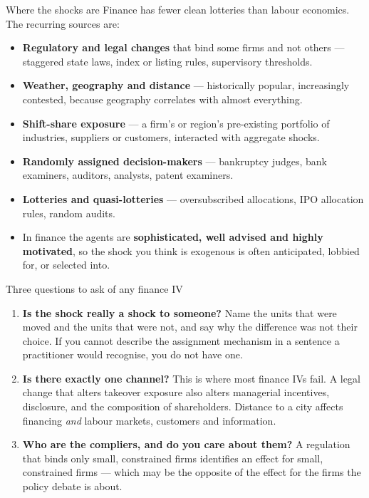 \documentclass[
  11pt,
  ignorenonframetext,
  aspectratio=169,
]{beamer}
\providecommand{\tightlist}{%
  \setlength{\itemsep}{0pt}\setlength{\parskip}{0pt}}
\begin{document}
\begin{frame}{Where the shocks are}
\protect{}\label{where-the-shocks-are}
Finance has fewer clean lotteries than labour economics. The recurring
sources are:

\begin{itemize}
\tightlist
\item
  \textbf{Regulatory and legal changes} that bind some firms and not
  others --- staggered state laws, index or listing rules, supervisory
  thresholds.
\item
  \textbf{Weather, geography and distance} --- historically popular,
  increasingly contested, because geography correlates with almost
  everything.
\item
  \textbf{Shift-share exposure} --- a firm's or region's pre-existing
  portfolio of industries, suppliers or customers, interacted with
  aggregate shocks.
\item
  \textbf{Randomly assigned decision-makers} --- bankruptcy judges, bank
  examiners, auditors, analysts, patent examiners.
\item
  \textbf{Lotteries and quasi-lotteries} --- oversubscribed allocations,
  IPO allocation rules, random audits.
\end{itemize}

\vspace{0.4em}

\begin{itemize}
\tightlist
\item
  In finance the agents are \textbf{sophisticated, well advised and
  highly motivated}, so the shock you think is exogenous is often
  anticipated, lobbied for, or selected into.
\end{itemize}
\end{frame}

\begin{frame}{Three questions to ask of any finance IV}
\protect{}\label{three-questions-to-ask-of-any-finance-iv}
\begin{enumerate}
\tightlist
\item
  \textbf{Is the shock really a shock to someone?} Name the units that
  were moved and the units that were not, and say why the difference was
  not their choice. If you cannot describe the assignment mechanism in a
  sentence a practitioner would recognise, you do not have one.
\item
  \textbf{Is there exactly one channel?} This is where most finance IVs
  fail. A legal change that alters takeover exposure also alters
  managerial incentives, disclosure, and the composition of
  shareholders. Distance to a city affects financing \emph{and} labour
  markets, customers and information.
\item
  \textbf{Who are the compliers, and do you care about them?} A
  regulation that binds only small, constrained firms identifies an
  effect for small, constrained firms --- which may be the opposite of
  the effect for the firms the policy debate is about.
\end{enumerate}
\end{frame}
\end{document}
